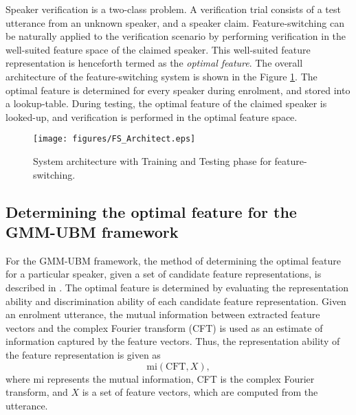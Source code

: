 \documentclass{article}
\begin{document}
Speaker verification is a two-class problem. A verification trial consists of a
test utterance from an unknown speaker, and a speaker claim. Feature-switching
can be naturally applied to the verification scenario by performing
verification in the well-suited feature space of the claimed speaker. This
well-suited feature representation is henceforth termed as the \emph{optimal
feature}. The overall architecture of the feature-switching system is shown in the
Figure \ref{fig:systemArch}. The optimal feature is determined for every speaker
during enrolment, and stored into a lookup-table. During testing, the optimal
feature of the claimed speaker is looked-up, and verification is performed in
the optimal feature space.

\begin{figure}[th]
\centering
\texttt{[image: figures/FS\_Architect.eps]}
\caption{System architecture with Training and Testing phase for feature-switching.}
\label{fig:systemArch}
\end{figure}



\subsection{Determining the optimal feature for the GMM-UBM framework}
\label{subsec:ubm_optFeat}

For the GMM-UBM framework, the method of determining the optimal feature for a
particular speaker, given a set of candidate feature representations, is
described in \cite{padmanInterspeech2010}. The optimal feature is determined by
evaluating the representation ability and discrimination ability
of each candidate feature representation. Given an enrolment utterance, the mutual information between extracted feature vectors and the complex Fourier transform (CFT) is used as an estimate of information captured by the feature vectors. Thus, the
representation ability of the feature representation is given as 
\begin{equation}
\textrm{mi}(\textrm{CFT},X),
\end{equation}
where $\textrm{mi}$ represents the mutual information, CFT is the complex
Fourier transform, and $X$ is a set of feature vectors, which are computed from
the utterance.
\end{document}
